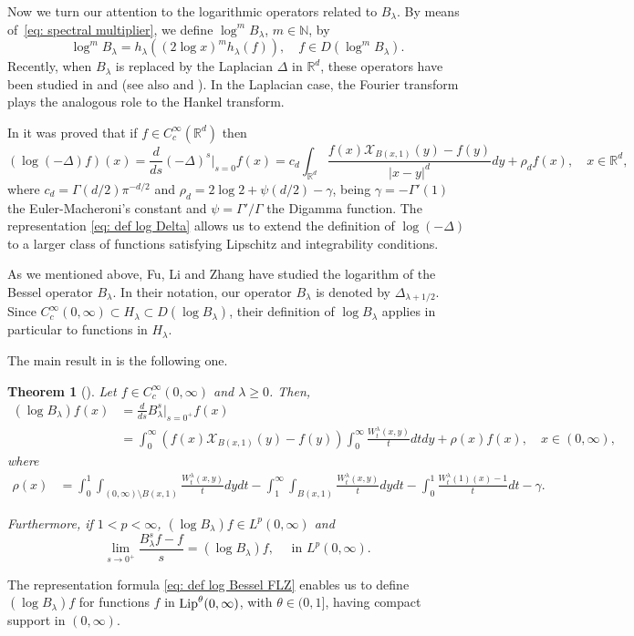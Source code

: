 \documentclass[a4paper,10pt, reqno]{amsart}
\newtheorem{ThA}{Theorem}
\theoremstyle{definition}
\theoremstyle{remark}
\numberwithin{equation}{section}
\begin{document}
Now we turn our attention to the logarithmic operators related to $B_\lambda$. By means of~\eqref{eq: spectral multiplier}, we define $\log^mB_\lambda$, $m\in \mathbb N$,  by
\[
\log^mB_\lambda =h_\lambda ((2\log x)^mh_\lambda (f)),\quad f\in D(\log^mB_\lambda).
\]
Recently, when $B_\lambda$ is replaced by the Laplacian $\Delta$ in $\mathbb R^d$, these operators  have been studied in \cite{Ch, ChHW} and \cite{ChW} (see also \cite{ChV2, ChV1, F, JSW, LW} and \cite{Le}). In the Laplacian case, the Fourier transform plays the analogous role to the Hankel transform.

In \cite[Theorem 1.1]{ChW} it was proved that if $f\in C_c^\infty (\mathbb R^d)$ then
\begin{equation}\label{eq: def log Delta}
(\log (-\Delta)f)(x)=\frac{d}{ds}(-\Delta )^s\Big|_{s=0}f(x)=c_d\int_{\mathbb R^d}\frac{f(x)\mathcal X_{B(x,1)}(y)-f(y)}{|x-y|^d}dy+\rho _df(x),\quad x\in \mathbb R^d,   
\end{equation}
where $c_d=\Gamma (d/2)\pi ^{-d/2}$ and $\rho _d=2\log2+ \psi(d/2)-\gamma$, being $\gamma=-\Gamma'(1)$ the Euler-Macheroni's constant and $\psi =\Gamma '/\Gamma $ the Digamma function. The representation \eqref{eq: def log Delta} allows us to extend the definition of $\log (-\Delta)$ to a larger class of functions satisfying Lipschitz and integrability conditions.

As we mentioned above, Fu, Li and Zhang \cite{FLZ} have studied the logarithm of the Bessel operator $B_\lambda$. In their notation, our operator $B_\lambda$ is denoted by $\Delta _{\lambda+1/2}$. Since $C_c^\infty(0,\infty)\subset H_\lambda\subset D(\log B_\lambda)$, their definition of $\log B_\lambda$ applies in particular to functions in $H_\lambda$. 

The main result in \cite{FLZ} is the following one.
\begin{ThA}[{\cite[Theorem 2.4]{FLZ}}]\label{thm: ThA}  Let $f\in C_c^\infty (0,\infty)$ and $\lambda \geq 0$. Then,
\begin{align}\label{eq: def log Bessel FLZ}
    (\log B_\lambda)f(x)&=\frac{d}{ds}B_\lambda^s\Big|_{s=0^+}f(x)\nonumber\\
    &=\int_0^\infty (f(x)\mathcal X_{B(x,1)}(y)-f(y))\int_0^\infty \frac{W_t^\lambda(x,y)}{t} dtdy+\rho (x)f(x),\quad x\in (0,\infty),
\end{align}
where
\begin{align*}
    \rho (x)&=\int_0^1\int_{(0,\infty)\setminus B(x,1)}\frac{W_t^\lambda (x,y)}{t}dydt-\int_1^\infty \int_{B(x,1)}\frac{W_t^\lambda (x,y)}{t}dydt-\int_0^1\frac{W_t^\lambda(1)(x)-1}{t}dt-\gamma.
\end{align*}


Furthermore, if $1<p<\infty$, $(\log B_\lambda)f\in L^p(0,\infty)$ and
\[
\lim_{s\rightarrow 0^+}\frac{B_\lambda^sf-f}{s}=(\log B_\lambda)f,\quad \mbox{ in }L^p(0,\infty).
\]    
\end{ThA}
The representation formula \eqref{eq: def log Bessel FLZ} enables us to define $(\log B_\lambda)f$ for functions $f$ in ${\textup{Lip}}^\theta(0,\infty)$, with $\theta\in(0,1]$, having compact support in $(0,\infty)$.
\end{document}
